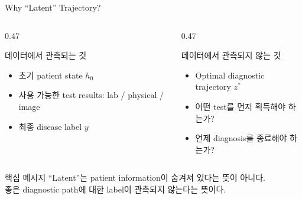 \documentclass[11pt,notheorems,hyperref={pdfauthor=whatever}]{beamer}
\begin{document}
\begin{frame}[t]{Why ``Latent'' Trajectory?}
\small
\begin{columns}[T,onlytextwidth]
\begin{column}{0.47\textwidth}
\begin{block}{데이터에서 관측되는 것}
\begin{itemize}
  \item 초기 patient state \(h_0\)
  \item 사용 가능한 test results: lab / physical / image
  \item 최종 disease label \(y\)
\end{itemize}
\end{block}
\end{column}
\begin{column}{0.47\textwidth}
\begin{alertblock}{데이터에서 관측되지 않는 것}
\begin{itemize}
  \item Optimal diagnostic trajectory \(z^*\)
  \item 어떤 test를 먼저 획득해야 하는가?
  \item 언제 diagnosis를 종료해야 하는가?
\end{itemize}
\end{alertblock}
\end{column}
\end{columns}
\vspace{1.0em}
\begin{block}{핵심 메시지}
\centering
``Latent''는 patient information이 숨겨져 있다는 뜻이 아니다.\\
\vspace{0.2em}
좋은 diagnostic path에 대한 label이 관측되지 않는다는 뜻이다.
\end{block}
\end{frame}
\end{document}
